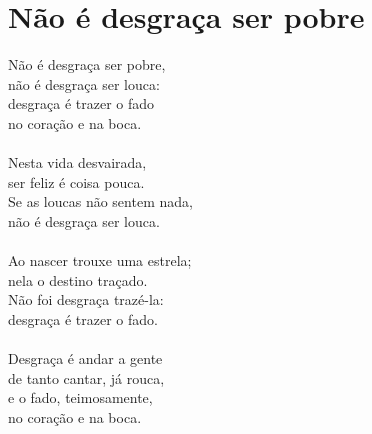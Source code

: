 \documentclass{article}
\begin{document}
\section{ Não é desgraça ser pobre}
Não é desgraça ser pobre,\\
não é desgraça ser louca:\\
desgraça é trazer o fado\\
no coração e na boca.\\
\\
Nesta vida desvairada,\\
ser feliz é coisa pouca.\\
Se as loucas não sentem nada,\\
não é desgraça ser louca.\\
\\
Ao nascer trouxe uma estrela;\\
nela o destino traçado.\\
Não foi desgraça trazé-la:\\
desgraça é trazer o fado.\\
\\
Desgraça é andar a gente\\
de tanto cantar, já rouca,\\
e o fado, teimosamente,\\
no coração e na boca.\\
\\
\\
\\
\end{document}
